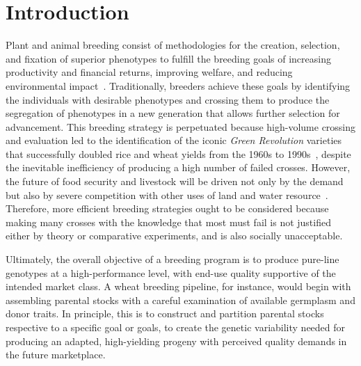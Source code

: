 \documentclass[12pt, a4paper, bibliography=totoc]{scrartcl}
\begin{document}
\section*{Introduction}\label{sec:intro} 
Plant and animal breeding consist of methodologies for the creation, selection, and fixation of superior phenotypes to fulfill the breeding goals of increasing productivity and financial returns, improving welfare, and reducing environmental impact~\citep{oldenbroek2015textbook}. Traditionally, breeders achieve these goals  by identifying the individuals with desirable phenotypes and crossing them to produce the segregation of phenotypes in a new generation that allows further selection for advancement. This breeding strategy is perpetuated because high-volume crossing and evaluation led to the identification of the iconic \emph{Green Revolution} varieties that successfully doubled rice and wheat yields from the 1960s to 1990s~\citep{hesser2006man}, despite the inevitable inefficiency of producing a high number of failed crosses. However, the future of food security and livestock will be driven not only by the demand but also by severe competition with other uses of land and water resource~\citep{cassandro2020animal}. Therefore, more efficient breeding strategies ought to be considered because making many crosses with the knowledge that most must fail is not justified either by theory or comparative experiments,  and is also socially unacceptable.

Ultimately, the  overall objective of a breeding program is to produce pure-line  genotypes at a high-performance level, with end-use quality supportive of the intended market class. A wheat breeding pipeline, for instance, would begin with assembling parental stocks with a careful examination of available germplasm and donor traits. In principle, this is to construct and partition parental stocks respective to a specific goal or goals, to create the genetic variability needed for producing an adapted, high-yielding progeny with perceived quality demands in the future marketplace. 
\end{document}
